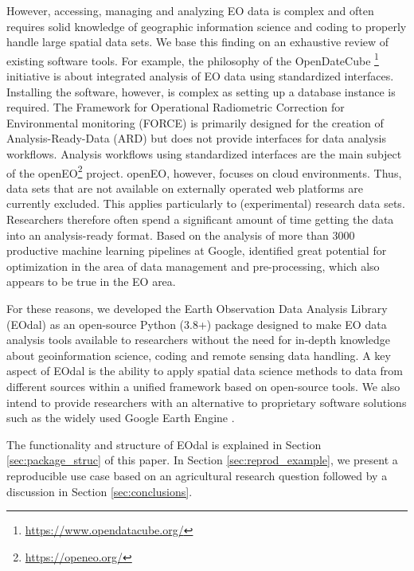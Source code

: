 However, accessing, managing and analyzing EO data is complex and often requires solid knowledge of geographic information science and coding to properly handle large spatial data sets. We base this finding on an exhaustive review of existing software tools. For example, the philosophy of the OpenDateCube \footnote{\url{https://www.opendatacube.org/}} initiative is about integrated analysis of EO data using standardized interfaces. Installing the software, however, is complex as setting up a database instance is required. The Framework for Operational Radiometric Correction for Environmental monitoring (FORCE) \citep{frantz_forcelandsat_2019} is primarily designed for the creation of Analysis-Ready-Data (ARD) but does not provide interfaces for data analysis workflows. Analysis workflows using standardized interfaces are the main subject of the openEO\footnote{\url{https://openeo.org/}} project. openEO, however, focuses on cloud environments. Thus, data sets that are not available on externally operated web platforms are currently excluded. This applies particularly to (experimental) research data sets. Researchers therefore often spend a significant amount of time getting the data into an analysis-ready format. Based on the analysis of more than 3000 productive machine learning pipelines at Google, \citet{xin_production_2021} identified great potential for optimization in the area of data management and pre-processing, which also appears to be true in the EO area.

For these reasons, we developed the Earth Observation Data Analysis Library (EOdal) as an open-source Python (3.8+) package designed to make EO data analysis tools available to researchers without the need for in-depth knowledge about geoinformation science, coding and remote sensing data handling. A key aspect of EOdal is the ability to apply spatial data science methods to data from different sources within a unified framework based on open-source tools. We also intend to provide researchers with an alternative to proprietary software solutions such as the widely used Google Earth Engine \citep{gorelick_google_2017}.

The functionality and structure of EOdal is explained in Section \ref{sec:package_struc} of this paper. In Section \ref{sec:reprod_example}, we present a reproducible use case based on an agricultural research question followed by a discussion in Section \ref{sec:conclusions}.

